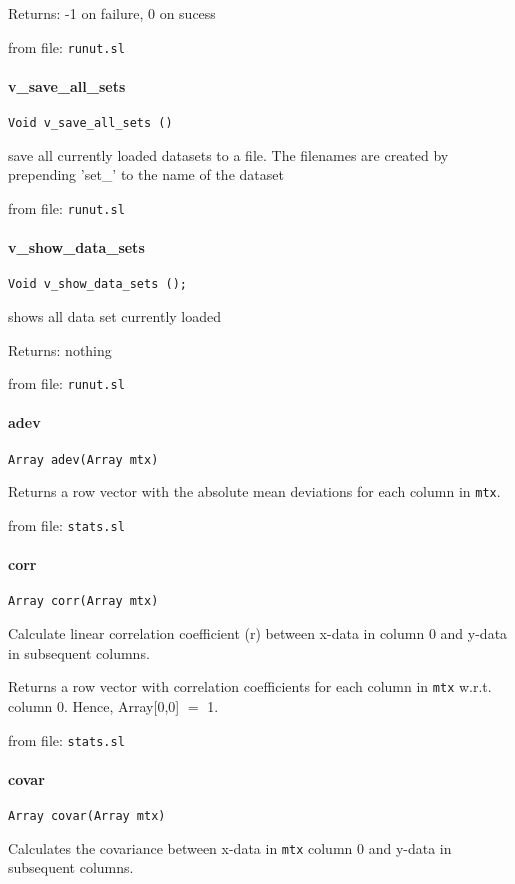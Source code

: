 Returns: -1 on failure, 0 on sucess

from file: {\tt runut.sl}


\paragraph{v\_save\_all\_sets}
\begin{verbatim}
Void v_save_all_sets ()
\end{verbatim}
save all currently loaded datasets to a file. The
filenames are created by prepending 'set\_' to the name of
the dataset

from file: {\tt runut.sl}


\paragraph{v\_show\_data\_sets}
\begin{verbatim}
Void v_show_data_sets ();
\end{verbatim}
shows all data set currently loaded


Returns: nothing

from file: {\tt runut.sl}


\paragraph{adev}
\begin{verbatim}
Array adev(Array mtx)
\end{verbatim}
Returns a row vector with the absolute mean deviations for
each column in {\tt mtx}.

from file: {\tt stats.sl}


\paragraph{corr}
\begin{verbatim}
Array corr(Array mtx)
\end{verbatim}
Calculate linear correlation coefficient (r) between x-data in
column 0 and y-data in subsequent columns.


Returns a row vector with correlation coefficients for each
column in {\tt mtx} w.r.t. column 0. Hence, Array[0,0] $=$ 1.

from file: {\tt stats.sl}


\paragraph{covar}
\begin{verbatim}
Array covar(Array mtx)
\end{verbatim}
Calculates the covariance between x-data in {\tt mtx} column 0 and
y-data in subsequent columns.


